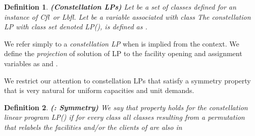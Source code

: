 \documentclass[11pt]{article}
\newtheorem{definition}{Definition}[section]
\newcommand{\lbfl}{{\sc Lbfl}}
\newcommand{\cfl}{{\sc Cfl}}
\begin{document}
\vspace*{-0.05cm}
\begin{sloppypar}
\begin{definition}  {\bf (Constellation LPs)} \label{def:constell}
Let  be a set of classes defined for an instance 
of \cfl\ or \lbfl. Let   be a variable associated with class 
The {\em  constellation LP with class set}
   denoted LP(),  is defined as .


\begin{comment}

\end{comment}
\end{definition}
\end{sloppypar}
\vspace*{-0.03cm}


\noindent 
We  refer simply to a {\em constellation LP} when
 is implied from the context.  
We define the \emph{projection}  of solution  
of  LP to the  facility opening
and assignment variables  as  and 
.
\iffalse --------------- due to SPACE
We will restrict our attention to  constellation LPs that satisfy a  natural property:   the LP is symmetric
 with respect to the clients and  the  facilities. 
The fact  that all facilities have the  same capacity / lower bound and all
clients have unit demand makes  this  property quite sound. 
For a class    and
 a permutation of the facilities, we denote by 
the class resulting by exchanging  for all  the values  of the   and
 coordinates 
of   with   the value of  the   and  coordinates of
. Similarly,  for  a permutation of the clients, we denote  by  the class resulting  by exchanging for
every   the value of  the  coordinate of   with
 the value of the  coordinate of .


\begin{definition} {\bf (: Symmetry)} \label{def:symmetry}
We  say  that property    holds for the constellation linear program LP()   if  the
following is  true: let  be any  permutation of   and  any permutation of .
 Then, for every  class    
and  are also in 
\end{definition}
\vspace*{-0.6cm}

------------------------------ \fi 
We  restrict our attention to  constellation LPs that satisfy a
symmetry property that is very natural for uniform capacities and unit
demands. 

\vspace*{-0.1cm}
\begin{definition} {\bf (: Symmetry)} \label{def:symmetry}
We  say  that property    holds for the constellation linear program LP()   if  
 for every  class   all classes resulting from
 a  permutation that relabels the facilities and/or the clients of
  are
 also in 
\end{definition}
\vspace*{-0.3cm}
\end{document}
